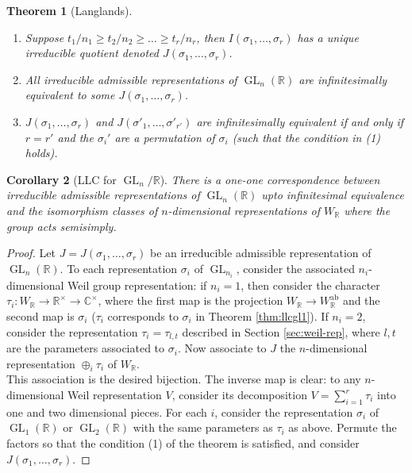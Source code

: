 \documentclass{amsart}
\numberwithin{equation}{section}
\theoremstyle{plain}
\newtheorem{theorem}{Theorem}[section]
\newtheorem{corollary}[theorem]{Corollary}
\theoremstyle{definition}
\theoremstyle{remark}
\newcommand{\osum}{\oplus}
\renewcommand{\_}[2]{\underbrace{#1}_{#2}}
\renewcommand{\^}[2]{\overbrace{#1}_{#2}}
\newcommand{\R}{\mathbb{R}}
\newcommand{\C}{\mathbb{C}}
\newcommand{\GL}{\operatorname{GL}}
\begin{document}
\begin{theorem}[Langlands]
\begin{enumerate}
\item Suppose $t_1/n_1 \geq t_2/n_2 \geq \dots \geq t_r/n_r$, then $I(\sigma_1,\dots, \sigma_r)$ has a unique irreducible quotient denoted $J(\sigma_1,\dots,\sigma_r)$.
\item All irreducible admissible representations of $\GL_n(\R)$ are infinitesimally equivalent to some $J(\sigma_1, \dots, \sigma_r)$. 
\item $J(\sigma_1,\dots,\sigma_r)$ and $J(\sigma'_1,\dots,\sigma'_{r'})$ are infinitesimally equivalent if and only if $r = r'$ and the $\sigma_i'$ are a permutation of $\sigma_i$ (such that the condition in (1) holds).
\end{enumerate}
\end{theorem}

\begin{corollary}[LLC for $\GL_n/\R$]
There is a one-one correspondence between irreducible admissible representations of $\GL_n(\R)$ upto infinitesimal equivalence and the isomorphism classes of $n$-dimensional representations of $W_\R$ where the group acts semisimply.
\end{corollary}
\begin{proof}
Let $J = J(\sigma_1,\dots, \sigma_r)$ be an irreducible admissible representation of $\GL_n(\R)$. To each representation $\sigma_i$ of $\GL_{n_i}$, consider the associated $n_i$-dimensional Weil group representation: if $n_i = 1$, then consider the character $\tau_i: W_\R \to \R^\times \to \C^\times$, where the first map is the projection $W_\R \to W_\R^{\text{ab}}$ and the second map is $\sigma_i$ ($\tau_i$ corresponds to $\sigma_i$ in Theorem \ref{thm:llcgl1}). If $n_i = 2$, consider the representation $\tau_i = \tau_{l,t}$ described in Section \ref{sec:weil-rep}, where $l, t$ are the parameters associated to $\sigma_i$. Now associate to $J$ the $n$-dimensional representation $\osum_i \tau_i$ of $W_\R$.\\
This association is the desired bijection. The inverse map is clear: to any $n$-dimensional Weil representation $V$, consider its decomposition $V = \sum_{i=1}^r \tau_i$ into one and two dimensional pieces. For each $i$, consider the representation $\sigma_i$ of $\GL_1(\R)$ or $\GL_2(\R)$ with the same parameters as $\tau_i$ as above. Permute the factors so that the condition (1) of the theorem is satisfied, and consider $J(\sigma_1,\dots,\sigma_r)$.
\end{proof}
\nocite{*}


\end{document}
